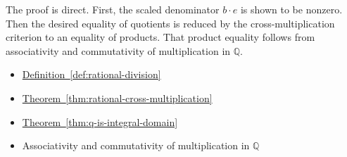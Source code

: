 \begin{remark*}
The proof is direct. First, the scaled denominator $b\cdot e$ is shown
to be nonzero. Then the desired equality of quotients is reduced by the
cross-multiplication criterion to an equality of products. That product
equality follows from associativity and commutativity of multiplication
in $\mathbb{Q}$.
\end{remark*}

\begin{dependencies}
\begin{itemize}
  \item \hyperref[def:rational-division]{Definition~\ref*{def:rational-division}}
  \item \hyperref[thm:rational-cross-multiplication]{Theorem~\ref*{thm:rational-cross-multiplication}}
  \item \hyperref[thm:q-is-integral-domain]{Theorem~\ref*{thm:q-is-integral-domain}}
  \item Associativity and commutativity of multiplication in $\mathbb{Q}$
\end{itemize}
\end{dependencies}

\clearpage
